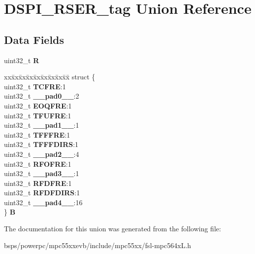\hypertarget{unionDSPI__RSER__tag}{}\section{D\+S\+P\+I\+\_\+\+R\+S\+E\+R\+\_\+tag Union Reference}
\label{unionDSPI__RSER__tag}
\subsection*{Data Fields}
\begin{DoxyCompactItemize}
\item 
\mbox{\label{unionDSPI__RSER__tag_a9f587a354e79451344da83d06806ba86}} 
uint32\+\_\+t {\bfseries R}
\item 
\mbox{\label{unionDSPI__RSER__tag_af396e42fd1215ffe3968c7c492883fda}} 
\begin{tabbing}
xx\=xx\=xx\=xx\=xx\=xx\=xx\=xx\=xx\=\kill
struct \{\\
\>uint32\_t {\bfseries TCFRE}:1\\
\>uint32\_t {\bfseries \_\_pad0\_\_}:2\\
\>uint32\_t {\bfseries EOQFRE}:1\\
\>uint32\_t {\bfseries TFUFRE}:1\\
\>uint32\_t {\bfseries \_\_pad1\_\_}:1\\
\>uint32\_t {\bfseries TFFFRE}:1\\
\>uint32\_t {\bfseries TFFFDIRS}:1\\
\>uint32\_t {\bfseries \_\_pad2\_\_}:4\\
\>uint32\_t {\bfseries RFOFRE}:1\\
\>uint32\_t {\bfseries \_\_pad3\_\_}:1\\
\>uint32\_t {\bfseries RFDFRE}:1\\
\>uint32\_t {\bfseries RFDFDIRS}:1\\
\>uint32\_t {\bfseries \_\_pad4\_\_}:16\\
\} {\bfseries B}\\

\end{tabbing}\end{DoxyCompactItemize}


The documentation for this union was generated from the following file\+:\begin{DoxyCompactItemize}
\item 
bsps/powerpc/mpc55xxevb/include/mpc55xx/fsl-\/mpc564x\+L.\+h\end{DoxyCompactItemize}
